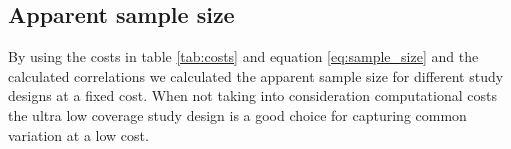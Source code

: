 \subsection{Apparent sample size}
\label{subsec:result_apparent}

By using the costs in table \ref{tab:costs} and equation \ref{eq:sample_size} and the calculated correlations we calculated the apparent sample size for different study designs at a fixed cost. When not taking into consideration computational costs the ultra low coverage study design is a good choice for capturing common variation at a low cost.

